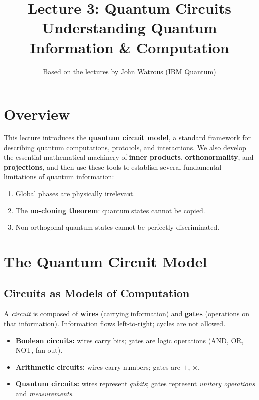 \documentclass[11pt]{article}
\title{\textbf{Lecture 3: Quantum Circuits} \\ \large Understanding Quantum Information \& Computation}
\author{Based on the lectures by John Watrous (IBM Quantum)}
\date{}
\theoremstyle{definition}
\begin{document}
\maketitle
\tableofcontents
\newpage

\section{Overview}

This lecture introduces the \textbf{quantum circuit model}, a standard framework for describing quantum computations, protocols, and interactions.  We also develop the essential mathematical machinery of \textbf{inner products}, \textbf{orthonormality}, and \textbf{projections}, and then use these tools to establish several fundamental limitations of quantum information:

\begin{enumerate}[label=(\roman*)]
    \item Global phases are physically irrelevant.
    \item The \textbf{no-cloning theorem}: quantum states cannot be copied.
    \item Non-orthogonal quantum states cannot be perfectly discriminated.
\end{enumerate}

\section{The Quantum Circuit Model}

\subsection{Circuits as Models of Computation}

A \emph{circuit} is composed of \textbf{wires} (carrying information) and \textbf{gates} (operations on that information).  Information flows left-to-right; cycles are not allowed.

\begin{itemize}
    \item \textbf{Boolean circuits:} wires carry bits; gates are logic operations (AND, OR, NOT, fan-out).
    \item \textbf{Arithmetic circuits:} wires carry numbers; gates are $+$, $\times$.
    \item \textbf{Quantum circuits:} wires represent \emph{qubits}; gates represent \emph{unitary operations} and \emph{measurements}.
\end{itemize}
\end{document}
